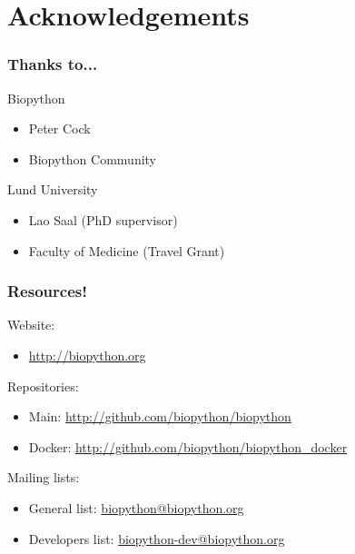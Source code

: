 \documentclass[trans]{beamer}
\begin{document}
\section*{Acknowledgements}
\frame
{
  \frametitle{Thanks to...}

  Biopython

  \begin{itemize}
  \item Peter Cock
  \item Biopython Community
  \end{itemize}

  Lund University

  \begin{itemize}
  \item Lao Saal (PhD supervisor)
  \item Faculty of Medicine (Travel Grant)
  \end{itemize}
}

\frame
{
  \frametitle{Resources!}

  \begin{center}
  Website:\\
  \begin{itemize}
  \item \url{http://biopython.org}
  \end{itemize}

  Repositories:\\
  \begin{itemize}
  \item Main: \url{http://github.com/biopython/biopython}
  \item Docker: \url{http://github.com/biopython/biopython_docker}
  \end{itemize}

  Mailing lists:
  \begin{itemize}
  \item General list: \url{biopython@biopython.org}
  \item Developers list: \url{biopython-dev@biopython.org}
  \end{itemize}
  \end{center}
}
\end{document}
